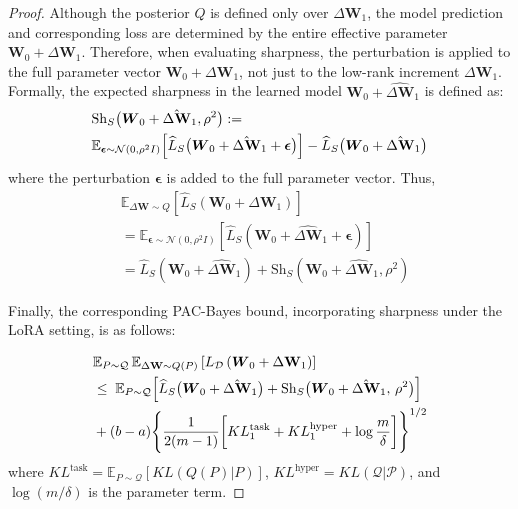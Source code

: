 \documentclass[letterpaper]{article} %
\begin{document}
\begin{proof}
Although the posterior $Q$ is defined only over $\Delta\boldsymbol{W}_1$, the model prediction and corresponding loss are determined by the entire effective parameter $\boldsymbol{W}_0 + \Delta\boldsymbol{W}_1$. Therefore, when evaluating sharpness, the perturbation is applied to the full parameter vector $\boldsymbol{W}_0 + \Delta\boldsymbol{W}_1$, not just to the low-rank increment $\Delta\boldsymbol{W}_1$. Formally, the expected sharpness in the learned model $\boldsymbol{W}_0 + \hat{\Delta\boldsymbol{W}}_1$ is defined as:
\begin{equation}
\begin{aligned}
&\mathrm{Sh}_S\big(\boldsymbol{W}_0 + \hat{\Delta\mathbf{W}}_1, \rho^2\big) := \\
&\mathbb{E}_{\boldsymbol{\epsilon} \sim \mathcal{N}(0, \rho^2 I)} \Big[
    \widehat{L}_S\big(\boldsymbol{W}_0 + \hat{\Delta\mathbf{W}}_1 + \boldsymbol{\epsilon}\big)
\Big] - \widehat{L}_S\big(\boldsymbol{W}_0 + \hat{\Delta\mathbf{W}}_1\big) 
\notag
\end{aligned}
\end{equation}
where the perturbation $\boldsymbol{\epsilon}$ is added to the full parameter vector. Thus,
\begin{equation}
    \begin{aligned}
    &\mathbb{E}_{\Delta\mathbf{W} \sim Q}[\widehat{L}_S(\mathbf{W}_0 + \Delta\mathbf{W}_1)] \\
    &= \mathbb{E}_{\boldsymbol{\epsilon} \sim \mathcal{N}(0, \rho^2 I)}[\widehat{L}_S(\mathbf{W}_0 + \hat{\Delta\mathbf{W}}_1 + \boldsymbol{\epsilon})]  \\
    &=\widehat{L}_S(\mathbf{W}_0 + \hat{\Delta\mathbf{W}}_1) + \mathrm{Sh}_S(\mathbf{W}_0+\hat{\Delta\mathbf{W}}_1, \rho^2)
\end{aligned}
\end{equation}


Finally, the corresponding PAC-Bayes bound, incorporating sharpness under the LoRA setting, is as follows:

\begin{align}
& \mathbb{E}_{P \sim \mathcal{Q}}\, \mathbb{E}_{\Delta\mathbf{W} \sim Q(P)} 
    \left[ L_{\mathcal{D}}\left(\boldsymbol{W}_0 + \Delta\mathbf{W}_1\right) \right] \notag \\
& \leq\; \mathbb{E}_{P \sim \mathcal{Q}} \Big[
        \widehat{L}_S\big(\boldsymbol{W}_0 + \hat{\Delta\mathbf{W}}_1\big)
        + \mathrm{Sh}_S\big(\boldsymbol{W}_0 + \hat{\Delta\mathbf{W}}_1,\, \rho^2\big)
    \Big] \notag \\
& + (b-a) 
    \Bigg\{ \frac{1}{2(m-1)} \bigg[
        KL^{\text{task}}_1 + KL^{\text{hyper}}_1 + \log\frac{m}{\delta}
    \bigg] \Bigg\}^{1/2}
\label{eq:single-task-pac-bayes}
\end{align}
where $KL^{\text{task}} = \mathbb{E}_{P \sim \mathcal{Q}}\left[ KL(Q(P)|P) \right]$,
$KL^{\text{hyper}} = KL(\mathcal{Q}|\mathcal{P})$,
and $\log(m/\delta)$ is the parameter term.



\end{proof}
\end{document}
